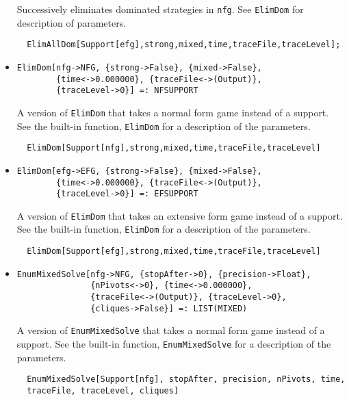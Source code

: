 \begin{itemize}
\bd 
Successively eliminates dominated strategies in \verb+nfg+. See
\verb+ElimDom+ for description of parameters.  
\begin{verbatim}
  ElimAllDom[Support[efg],strong,mixed,time,traceFile,traceLevel];
\end{verbatim} 
\ed

\item{}
\protect \large \begin{verbatim}
ElimDom[nfg->NFG, {strong->False}, {mixed->False}, 
        {time<->0.000000}, {traceFile<->(Output)}, 
        {traceLevel->0}] =: NFSUPPORT 
\end{verbatim}\normalsize

\bd 
A version of \verb+ElimDom+ that takes a normal form game instead
of a support.  See the built-in function, \verb+ElimDom+ for a
description of the parameters.
\begin{verbatim}
  ElimDom[Support[nfg],strong,mixed,time,traceFile,traceLevel]
\end{verbatim} 
\ed

\item{}
\protect \large \begin{verbatim}
ElimDom[efg->EFG, {strong->False}, {mixed->False}, 
        {time<->0.000000}, {traceFile<->(Output)}, 
        {traceLevel->0}] =: EFSUPPORT 
\end{verbatim}\normalsize

\bd 
A version of \verb+ElimDom+ that takes an extensive form game instead
of a support.  See the built-in function, \verb+ElimDom+ for a
description of the parameters.
\begin{verbatim}
  ElimDom[Support[efg],strong,mixed,time,traceFile,traceLevel]
\end{verbatim} 
\ed

\item{}
\protect \large \begin{verbatim}
EnumMixedSolve[nfg->NFG, {stopAfter->0}, {precision->Float}, 
               {nPivots<->0}, {time<->0.000000}, 
               {traceFile<->(Output)}, {traceLevel->0}, 
               {cliques->False}] =: LIST(MIXED) 
\end{verbatim}\normalsize

\bd 
A version of \verb+EnumMixedSolve+ that takes a normal form game instead
of a support.  See the built-in function, \verb+EnumMixedSolve+ for a
description of the parameters.
\begin{verbatim}
  EnumMixedSolve[Support[nfg], stopAfter, precision, nPivots, time, 
  traceFile, traceLevel, cliques]
\end{verbatim} 
\ed


\end{itemize}
